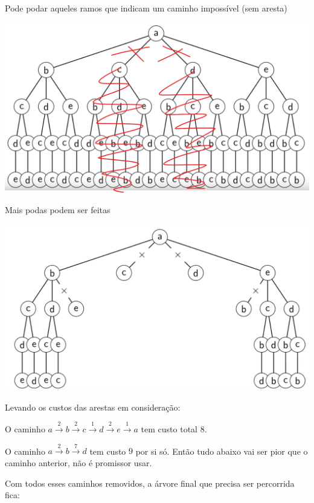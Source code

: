Pode podar aqueles ramos que indicam um caminho impossível (sem aresta)

\begin{example}
    \centering
    \includegraphics[width=.95\linewidth]{img/arvore_podada_tsp.png}
\end{example}

Mais podas podem ser feitas

\begin{example}
    \centering
    \includegraphics[width=.95\linewidth]{img/arvore_podada_tsp_2.png}
\end{example}

Levando os custos das arestas em consideração:

O caminho $a \xrightarrow{2} b \xrightarrow{2} c \xrightarrow{1} d \xrightarrow{2} e \xrightarrow{1} a$ tem custo total $8$.

O caminho $a \xrightarrow{2} b \xrightarrow{7} d$ tem custo $9$ por si só. Então tudo abaixo vai ser pior que o caminho anterior, não é promissor usar.

Com todos esses caminhos removidos, a árvore final que precisa ser percorrida fica:


